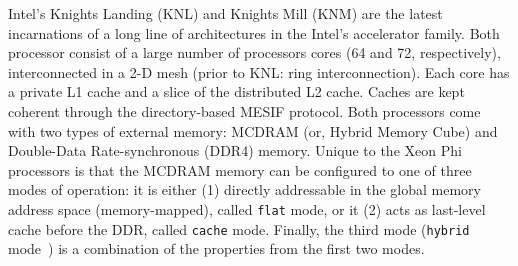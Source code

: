 \begin{comment}
\begin{figure}[tbp]
    \centering
    \texttt{[image: KNLvsKNM]}
    \caption{\label{fig:knlvsknm}Comparison of KNL and KNM architecture\cJD{Is this figure necessary? Isn't Table 1 enough?}}
\end{figure}
\end{comment}

Intel's Knights Landing (KNL) and Knights Mill (KNM) are the latest incarnations of a long line of architectures in the Intel's accelerator family. Both processor consist of a large number of processors cores (64 and 72, respectively), interconnected in a 2-D mesh (prior to KNL: ring interconnection). Each core has a private L1 cache and a slice of the distributed L2 cache. Caches are kept coherent through the directory-based MESIF protocol.
Both processors come with two types of external memory: MCDRAM (or, Hybrid Memory Cube) and Double-Data Rate-synchronous (DDR4) memory. Unique to the Xeon Phi processors is that the MCDRAM memory can be configured to one of three modes of operation: it is either (1) directly addressable in the global memory address space (memory-mapped), called \texttt{flat} mode, or it (2) acts as last-level cache before the DDR, called \texttt{cache} mode. Finally, the third mode (\texttt{hybrid} mode~\cite{heinecke_high_2016}) is a combination of the properties from the first two modes.

